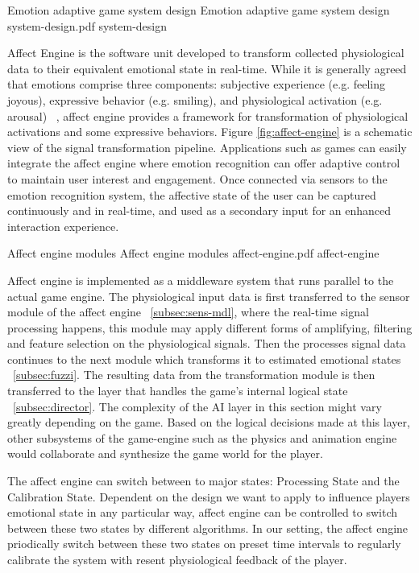 \documentclass[conference]{IEEEtran}
\begin{document}
\img
{Emotion adaptive game system design}
{Emotion adaptive game system design}
{system-design.pdf}
{system-design}

Affect Engine is the software unit developed to transform collected physiological data to their equivalent emotional state in real-time. While it is generally agreed that emotions comprise three components: subjective experience (e.g. feeling joyous), expressive behavior (e.g. smiling), and physiological activation (e.g. arousal) ~\cite{scherer1993neuroscience}, affect engine provides a framework for transformation of physiological activations and some expressive behaviors. Figure \ref{fig:affect-engine} is a schematic view of the signal transformation pipeline. Applications such as games can easily integrate the affect engine where emotion recognition can offer adaptive control to maintain user interest and engagement. Once connected via sensors to the emotion recognition system, the affective state of the user can be captured continuously and in real-time, and used as a secondary input for an enhanced interaction experience.

\img
{Affect engine modules}
{Affect engine modules}
{affect-engine.pdf}
{affect-engine}

Affect engine is implemented as a middleware system that runs parallel to the actual game engine. The physiological input data is first transferred to the sensor module of the affect engine ~\ref{subsec:sens-mdl}, where the real-time signal processing happens, this module may apply different forms of amplifying, filtering and feature selection on the physiological signals. Then the processes signal data continues to the next module which transforms it to estimated emotional states ~\ref{subsec:fuzzi}. The resulting data from the transformation module is then transferred to the layer that handles the game's internal logical state ~\ref{subsec:director}. The complexity of the AI layer in this section might vary greatly depending on the game. Based on the logical decisions made at this layer, other subsystems of the game-engine such as the physics and animation engine would collaborate and synthesize the game world for the player.

The affect engine can switch between to major states: Processing State and the Calibration State. Dependent on the design we want to apply to influence players emotional state in any particular way, affect engine can be controlled to switch between these two states by different algorithms. In our setting, the affect engine priodically switch between these two states on preset time intervals to regularly calibrate the system with resent physiological feedback of the player.
\end{document}
